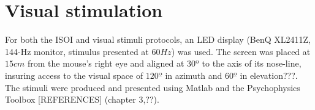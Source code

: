 \section{Visual stimulation}
\label{sec:Visual-stimulation}

For both the ISOI and visual stimuli protocols, an LED display (BenQ XL2411Z, 144-Hz monitor, stimulus presented at $60 Hz$) was used. The screen was placed at $15 cm$ from the mouse's right eye and  aligned at $30º$ to the axis of its nose-line, insuring access to the visual space of $120º$ in azimuth and $60º$ in elevation???. The stimuli were produced and presented using
Matlab and the Psychophysics Toolbox [REFERENCES] (chapter 3,??).
